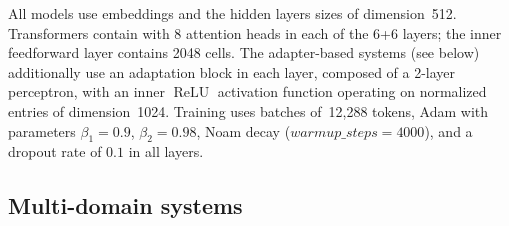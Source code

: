 All models use embeddings and the hidden layers sizes of dimension~512. Transformers contain with 8 attention heads in each of the 6+6 layers; the inner feedforward layer contains 2048 cells. The adapter-based systems (see below) additionally use an adaptation block in each layer, composed of a 2-layer perceptron, with an inner $\operatorname{ReLU}$ activation function operating on normalized entries of dimension~1024. 
Training uses batches of~12,288 tokens, Adam with parameters $\beta_1=0.9$, $\beta_2= 0.98$, Noam decay ($warmup\_steps=4000$), and a dropout rate of $0.1$ in all layers.

\subsection{Multi-domain systems \label{ssec:systems}}

